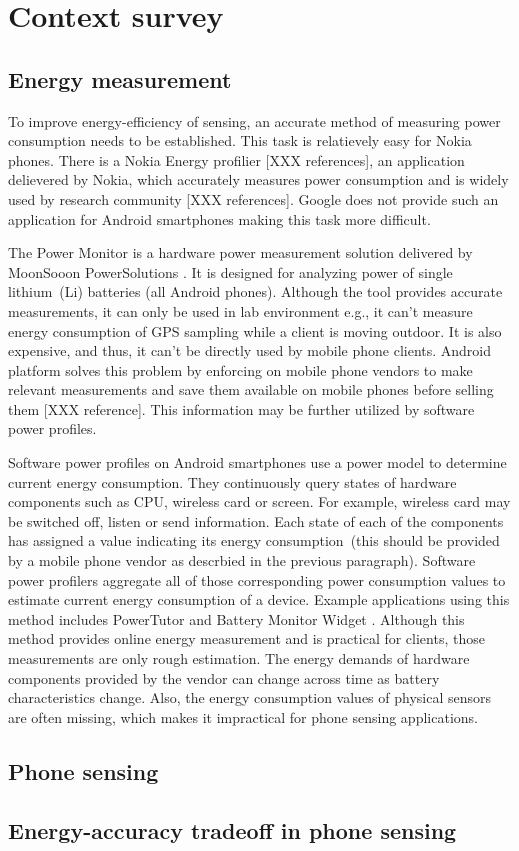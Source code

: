 \section{Context survey}
\label{s:contextsurvey}
\subsection{Energy measurement}
\hspace{10pt} To improve energy-efficiency of sensing, an accurate method of measuring power consumption needs to be established. This task is relatievely easy for Nokia phones. There is a Nokia Energy profilier [XXX references], an application delievered by Nokia, which accurately measures power consumption and is widely used by research community [XXX references]. Google does not provide such an application for Android smartphones making this task more difficult.

The Power Monitor is a hardware power measurement solution delivered by MoonSooon PowerSolutions \cite{_monsoon_????}.  It is designed for analyzing power of single lithium\ (Li) batteries (all Android phones). Although the tool provides accurate measurements, it can only be used in lab environment e.g., it can't measure energy consumption of GPS sampling while a client is moving outdoor. It is also expensive, and thus, it can't be directly used by mobile phone clients. Android platform solves this problem by enforcing on mobile phone vendors to make relevant measurements and save them available on mobile phones before selling them [XXX reference]. This information may be further utilized by software power profiles.

Software power profiles on Android smartphones use a power model to determine current energy consumption. They continuously query states of hardware components such as CPU, wireless card or screen. For example, wireless card may be switched off, listen or send information. Each state of each of the components has assigned a value indicating its energy consumption\ (this should be provided by a mobile phone vendor as descrbied in the previous paragraph). Software power profilers aggregate all of those corresponding power consumption values to estimate current energy consumption of a device. Example applications using this method includes PowerTutor \cite{zhang:powertutor} and Battery Monitor Widget \cite{_battery_????}. Although this method provides online energy measurement and is practical for clients, those measurements are only rough estimation. The energy demands of hardware components provided by the vendor can change across time as battery characteristics change. Also, the energy consumption values of physical sensors are often missing, which makes it impractical for phone sensing applications.





\subsection{Phone sensing}
\subsection{Energy-accuracy tradeoff in phone sensing}